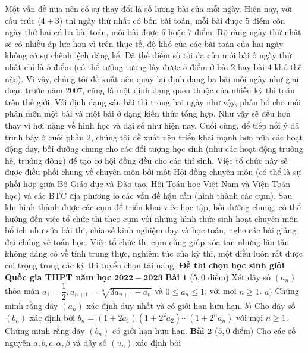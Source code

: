 \begin{multicols}{2}
	\vskip 0.05cm
	Một vấn đề nữa nên có sự thay đổi là số lượng bài của mỗi ngày. Hiện nay, với cấu trúc ($4+3$) thì ngày thứ nhất có bốn bài toán, mỗi bài được $5$ điểm còn ngày thứ hai có ba bài toán, mỗi bài được $6$ hoặc $7$ điểm. Rõ ràng ngày thứ nhất sẽ có nhiều áp lực hơn vì trên thực tế, độ khó của các bài toán của hai ngày không có sự chênh lệch đáng kể. Đã thế điểm số tối đa của mỗi bài ở ngày thứ nhất chỉ là $5$ điểm (có thể tưởng tượng lấy được $5$ điểm ở bài $2$ hay bài $4$ khó thế nào). Vì vậy, chúng tôi đề xuất nên quay lại định dạng ba bài mỗi ngày như giai đoạn trước năm $2007$, cũng là một định dạng quen thuộc của nhiều kỳ thi toán trên thế giới. Với định dạng sáu bài thì trong hai ngày như vậy, phân bổ cho mỗi phân môn một bài và một bài ở dạng kiến thức tổng hợp. Như vậy sẽ đều hơn thay vì hơi nặng về hình học và đại số như hiện nay. 
	\vskip 0.05cm
	Cuối cùng, để tiếp nối ý đã trình bày ở cuối phần $2$, chúng tôi đề xuất nên triển khai mạnh hơn nữa các hoạt động dạy, bồi dưỡng chung cho các đối tượng học sinh (như các hoạt động trường hè, trường đông) để tạo cơ hội đồng đều cho các thí sinh. Việc tổ chức này sẽ được điều phối chung về chuyên môn bởi một Hội đồng chuyên môn (có thể là sự phối hợp giữa Bộ Giáo dục và Đào tạo, Hội Toán học Việt Nam và Viện Toán học) và các BTC địa phương lo các vấn đề hậu cần (hình thành các cụm). 
	\vskip 0.05cm
	Sau khi hình thành được các cụm để triển khai việc học tập, bồi dưỡng chung, có thể hướng đến việc tổ chức thi theo cụm với những hình thức sinh hoạt chuyên môn bổ ích như sửa bài thi, chia sẻ kinh nghiệm dạy và học toán, nghe các bài giảng đại chúng về toán học. Việc tổ chức thi cụm cũng giúp xóa tan những lăn tăn không đáng có về tính trung thực, nghiêm túc của kỳ thi, một điều luôn rất được coi trọng trong các kỳ thi tuyển chọn tài năng. 
	\vskip 0.05cm
	\textbf{\color{cackithi}Đề thi chọn học sinh giỏi Quốc gia THPT năm học} $\pmb{2022-2023}$
	\vskip 0.05cm
	\textbf{\color{cackithi}Bài} $\pmb{1}$ ($5{,}0$ điểm) Xét dãy số $\left(a_n\right)$ thỏa mãn $a_1 = \dfrac{1}{2}, a_{n+1} = \sqrt[3]{3a_{n+1} - a_n}$ và $0 \le a_n \le 1$, với mọi $n \ge 1$.
	\vskip 0.05cm
	$a)$ Chứng minh rằng dãy $(a_n)$ xác định duy nhất và có giới hạn hữu hạn.
	\vskip 0.05cm
	$b)$ Cho dãy số $\left(b_n\right)$ xác định bởi $b_n = (1+ 2a_1)\left(1 + 2^2a_2\right)\cdots\left(1 + 2^na_n\right)$ với mọi $n \ge 1$. Chứng minh rằng dãy $\left(b_n\right)$ có giới hạn hữu hạn.
	\vskip 0.05cm
	\textbf{\color{cackithi}Bài} $\pmb{2}$ ($5{,}0$ điểm) Cho các số nguyên $a,b,c, \alpha,\beta$ và dãy số $\left(u_n\right)$ xác định bởi 

\end{multicols}
